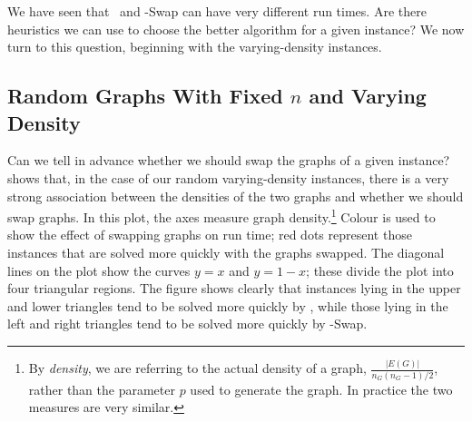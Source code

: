 We have seen that \McSplit\ and
\McSplit-Swap can have very different run times.  Are there heuristics we can
use to choose the better algorithm for a given instance? We now turn to this
question, beginning with the varying-density instances.

\subsection{Random Graphs With Fixed $n$ and Varying Density}

Can we tell in advance whether we should swap the graphs of a given instance?
 shows that, in the case of our
random varying-density instances, there is a very strong association between the densities
of the two graphs and whether we should swap graphs.  In this plot, the axes
measure graph density.\footnote{By \emph{density}, we are referring to the actual density of a graph,
$\frac{|E(G)|}{n_G(n_G-1)/2}$, rather than the parameter $p$ used to generate
the graph. In practice the two measures are very similar.} Colour is used to show
the effect of swapping graphs on run time; red dots represent those instances
that are solved more quickly with the graphs swapped.  The diagonal lines on the plot
show the curves $y=x$ and $y=1-x$; these divide the plot into four triangular regions.
The figure shows clearly that instances lying
in the upper and lower triangles tend to be solved more quickly by \McSplit, while
those lying in the left and right triangles tend to be solved more
quickly by \McSplit-Swap.

